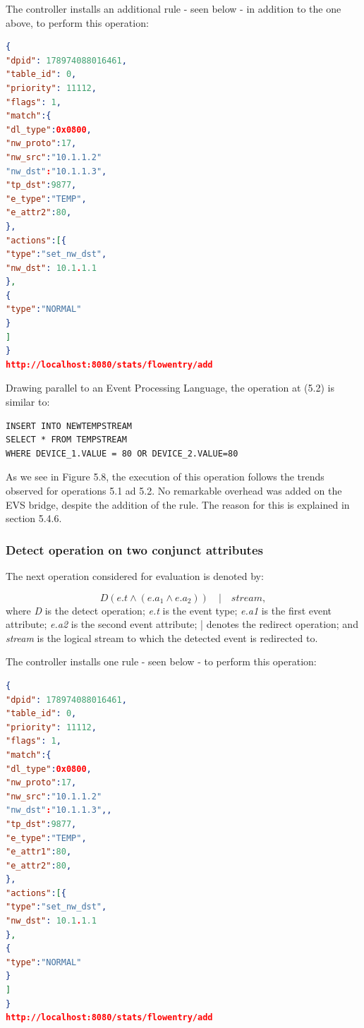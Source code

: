 The controller installs an additional rule - seen below - in addition to the one above, to perform this operation:
\begin{lstlisting}[language=json,firstnumber=1]
{
"dpid": 178974088016461,
"table_id": 0,
"priority": 11112,
"flags": 1,
"match":{
"dl_type":0x0800,
"nw_proto":17,
"nw_src":"10.1.1.2"
"nw_dst":"10.1.1.3",
"tp_dst":9877,
"e_type":"TEMP",
"e_attr2":80,
},
"actions":[{
"type":"set_nw_dst",
"nw_dst": 10.1.1.1
},
{
"type":"NORMAL"
}
]
}
http://localhost:8080/stats/flowentry/add \end{lstlisting}

Drawing parallel to an Event Processing Language, the operation at (5.2) is similar to:

\begin{verbatim}
INSERT INTO NEWTEMPSTREAM
SELECT * FROM TEMPSTREAM
WHERE DEVICE_1.VALUE = 80 OR DEVICE_2.VALUE=80
\end{verbatim}

As we see in Figure 5.8, the execution of this operation follows the trends observed for operations 5.1 ad 5.2. No remarkable overhead was added on the EVS bridge, despite the addition of the rule. The reason for this is explained in section 5.4.6.


\subsubsection{Detect operation on two conjunct attributes}
The next operation considered for evaluation is denoted by:

\begin{equation}D(e.t  \wedge (e.a_1 \wedge e.a_2)) \quad | \quad stream, \end{equation}
where \textit{D} is the detect operation; \newline
\textit{e.t} is the event type; \newline
\textit{e.a1} is the first event attribute; \newline
\textit{e.a2} is the second event attribute;
| denotes the redirect operation; \newline
and \textit{stream} is the logical stream to which the detected event is redirected to. \newline \newline

The controller installs one rule - seen below - to perform this operation:
\begin{lstlisting}[language=json,firstnumber=1]
{
"dpid": 178974088016461,
"table_id": 0,
"priority": 11112,
"flags": 1,
"match":{
"dl_type":0x0800,
"nw_proto":17,
"nw_src":"10.1.1.2"
"nw_dst":"10.1.1.3",,
"tp_dst":9877,
"e_type":"TEMP",
"e_attr1":80,
"e_attr2":80,
},
"actions":[{
"type":"set_nw_dst",
"nw_dst": 10.1.1.1
},
{
"type":"NORMAL"
}
]
}
http://localhost:8080/stats/flowentry/add \end{lstlisting}

